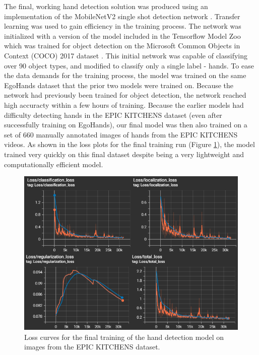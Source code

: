 \documentclass[12pt]{report}
\begin{document}
The final, working hand detection solution was produced using an implementation of the MobileNetV2 single shot detection network \cite{Sandler2018Mobilenetv2:Bottlenecks}. Transfer learning was used to gain efficiency in the training process. The network was initialized with a version of the model included in the Tensorflow Model Zoo which was trained for object detection on the Microsoft Common Objects in Context (COCO) 2017 dataset \cite{Lin2015MicrosoftContext}. This initial network was capable of classifying over 90 object types, and modified to classify only a single label - hands. To ease the data demands for the training process, the model was trained on the same EgoHands dataset that the prior two models were trained on. Because the network had previously been trained for object detection, the network reached high accuracty within a few hours of training. Because the earlier models had difficulty detecting hands in the EPIC KITCHENS dataset (even after successfully training on EgoHands), our final model was then also trained on a set of 660 manually annotated images of hands from the EPIC KITCHENS videos. As shown in the loss plots for the final training run (Figure \ref{hand_training}), the model trained very quickly on this final dataset despite being a very lightweight and computationally efficient model.

\begin{figure}[t]
\centerline{\includegraphics[width=\linewidth]{figure/hand_training.png}}
\caption{Loss curves for the final training of the hand detection model on images from the EPIC KITCHENS dataset.}
\label{hand_training}
\end{figure}
\end{document}
